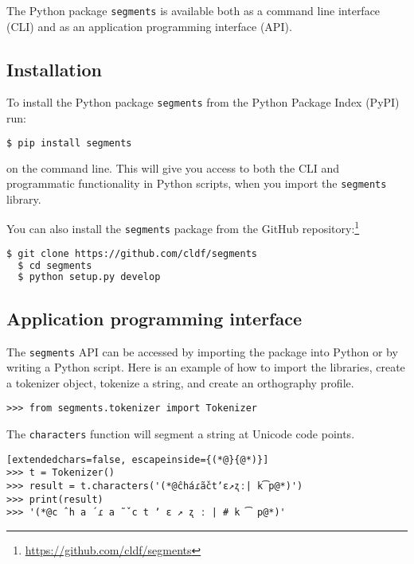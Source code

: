 \documentclass[output=book,nonflat,modfonts,
colorlinks, citecolor=brown,
		]{langsci/langscibook}\usepackage[]{graphicx}\usepackage[]{color}
\begin{document}
The Python package \texttt{segments} is available both as a command line interface (CLI) and as an application programming interface (API).

\subsection*{Installation}

To install the Python package \texttt{segments} from the Python Package Index (PyPI) run:

\begin{lstlisting}[language=bash]
  $ pip install segments
\end{lstlisting}

\noindent on the command line. This will give you access to both the CLI and programmatic functionality in Python scripts, when you import the \texttt{segments} library.

You can also install the \texttt{segments} package from the GitHub repository:\footnote{\url{https://github.com/cldf/segments}}

\begin{lstlisting}[language=bash]
  $ git clone https://github.com/cldf/segments
  $ cd segments
  $ python setup.py develop
\end{lstlisting}

\subsection*{Application programming interface}
The \texttt{segments} API can be accessed by importing the package into Python or by writing a Python script. Here is an example of how to import the libraries, create a tokenizer object, tokenize a string, and create an orthography profile.

\begin{lstlisting}
>>> from segments.tokenizer import Tokenizer
\end{lstlisting}

\noindent The \texttt{characters} function will segment a string at Unicode code points.

\begin{lstlisting}[extendedchars=false, escapeinside={(*@}{@*)}]
>>> t = Tokenizer()
>>> result = t.characters('(*@ĉháɾã̌ctʼɛ↗ʐː| k͡p@*)')
>>> print(result)
>>> '(*@c ̂ h a ́ ɾ a ̃ ̌ c t ʼ ɛ ↗ ʐ ː | # k ͡ p@*)'
\end{lstlisting}
\end{document}
